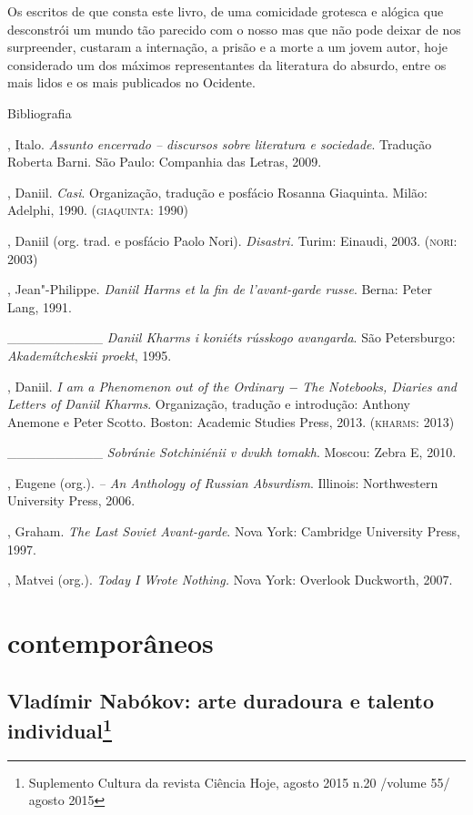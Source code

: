 Os escritos de que consta este livro, de uma comicidade grotesca e
alógica que desconstrói um mundo tão parecido com o nosso mas que não
pode deixar de nos surpreender, custaram a internação, a prisão e a
morte a um jovem autor, hoje considerado um dos máximos representantes
da literatura do absurdo, entre os mais lidos e os mais publicados no
Ocidente.

Bibliografia

, Italo. \emph{Assunto encerrado -- discursos sobre literatura
e sociedade}. Tradução Roberta Barni. São Paulo: Companhia das Letras,
2009.

, Daniil. \emph{Casi}. Organização, tradução e posfácio
Rosanna Giaquinta. Milão: Adelphi, 1990. (\textsc{giaquinta}: 1990)

, Daniil (org. trad. e posfácio Paolo Nori). \emph{Disastri.}
Turim: Einaudi, 2003. (\textsc{nori}: 2003)

, Jean"-Philippe. \emph{Daniil Harms et la fin de
l'avant-garde russe}. Berna: Peter Lang, 1991.

\_\_\_\_\_\_\_\_\_\_ \emph{Daniil Kharms i koniéts rússkogo
avangarda}. São Petersburgo: \emph{Akademítcheskii proekt}, 1995.

, Daniil. \emph{I am a Phenomenon out of the Ordinary −
The Notebooks, Diaries and Letters of Daniil Kharms}. Organização,
tradução e introdução: Anthony Anemone e Peter Scotto. Boston: Academic
Studies Press, 2013. (\textsc{kharms}: 2013)

\_\_\_\_\_\_\_\_\_\_ \emph{Sobránie Sotchiniénii v dvukh
tomakh}. Moscou: Zebra E, 2010.

, Eugene (org.). \emph{ -- An Anthology of
Russian Absurdism}. Illinois: Northwestern University Press, 2006.

, Graham. \emph{The Last Soviet Avant-garde}. Nova York:
Cambridge University Press, 1997.

, Matvei (org.). \emph{Today I Wrote Nothing.} Nova York:
Overlook Duckworth, 2007.

\part{contemporâneos}

\chapter{Vladímir Nabókov: arte duradoura e talento individual\footnote{Suplemento Cultura da revista Ciência Hoje, agosto 2015 n.20 /volume 55/ agosto 2015}}

